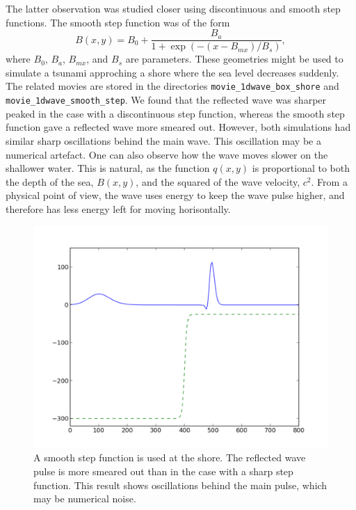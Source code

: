 \documentclass[twoside]{article}
\begin{document}
The latter observation was studied closer using discontinuous and smooth step functions. The smooth step function was of the form 
\begin{equation}
  B(x, y) = B_{0} + \frac{B_{a}}{1 + \exp\left(-(x-B_{mx})/B_{s}\right)}, 
\end{equation}
where $B_{0}$, $B_{a}$, $B_{mx}$, and $B_{s}$ are parameters. These geometries might be used to simulate a tsunami approching a shore where the sea level decreases suddenly. The related movies are stored in the directories \verb+movie_1dwave_box_shore+ and \newline \verb+movie_1dwave_smooth_step+. We found that the reflected wave was sharper peaked in the case with a discontinuous step function, whereas the smooth step function gave a reflected wave more smeared out. However, both simulations had similar sharp oscillations behind the main wave. This oscillation may be a numerical artefact. One can also observe how the wave moves slower on the shallower water. This is natural, as the function $q(x, y)$ is proportional to both the depth of the sea, $B(x, y)$, and the squared of the wave velocity, $c^{2}$. From a physical point of view, the wave uses energy to keep the wave pulse higher, and therefore has less energy left for moving horisontally.

\begin{figure} 
  \centering
  \includegraphics[scale=0.4]{gustavs_codes/movie_1dwave_smooth_step/figure.pdf}
  \caption{A smooth step function is used at the shore. The reflected wave pulse is more smeared out than in the case with a sharp step function. This result shows oscillations behind the main pulse, which may be numerical noise.}
\end{figure}
\end{document}
